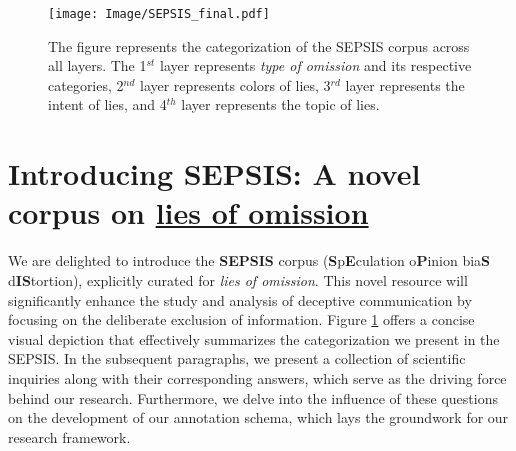 
\begin{figure}[!tbh]
\centering
\texttt{[image: Image/SEPSIS\_final.pdf]}
\vspace{-5mm}
\caption{The figure represents the categorization of the SEPSIS corpus across all layers. The 1$^{st}$ layer represents \textit{type of omission} and its respective categories, 2$^{nd}$ layer represents colors of lies, 3$^{rd}$ layer represents the intent of lies, and 4$^{th}$ layer represents the topic of lies. }
\label{fig:sepsis}
\vspace{-5mm}
\end{figure}

\section{Introducing SEPSIS: A novel corpus on \ul{lies of omission}}
\label{sec:introduction}
\vspace{-1.5mm}
We are delighted to introduce the \textbf{SEPSIS} corpus (\textbf{S}p\textbf{E}culation o\textbf{P}inion bia\textbf{S} d\textbf{I}\textbf{S}tortion), explicitly curated for \emph{lies of omission}. This novel resource will significantly enhance the study and analysis of deceptive communication by focusing on the deliberate exclusion of information. Figure \ref{fig:sepsis} offers a concise visual depiction that effectively summarizes the categorization we present in the SEPSIS. 
In the subsequent paragraphs, we present a collection of scientific inquiries along with their corresponding answers, which serve as the driving force behind our research. Furthermore, we delve into the influence of these questions on the development of our annotation schema, which lays the groundwork for our research framework.

